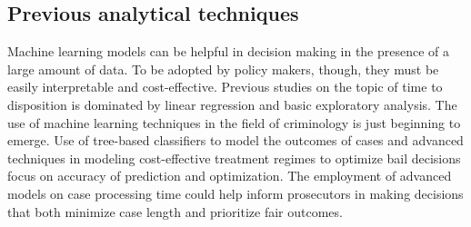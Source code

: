 \subsection{Previous analytical techniques}

Machine learning models can be helpful in decision making in the presence of a large amount of data. To be adopted by policy makers, though, they must be easily interpretable and cost-effective. Previous studies on the topic of time to disposition is dominated by linear regression and basic exploratory analysis. The use of machine learning techniques in the field of criminology is just beginning to emerge. Use of tree-based classifiers to model the outcomes of cases \cite{katz_general_2017} and advanced techniques in modeling cost-effective treatment regimes to optimize bail decisions \cite{lakkaraju_learning_2016} focus on accuracy of prediction and optimization. The employment of advanced models on case processing time could help inform prosecutors in making decisions that both minimize case length and prioritize fair outcomes.
